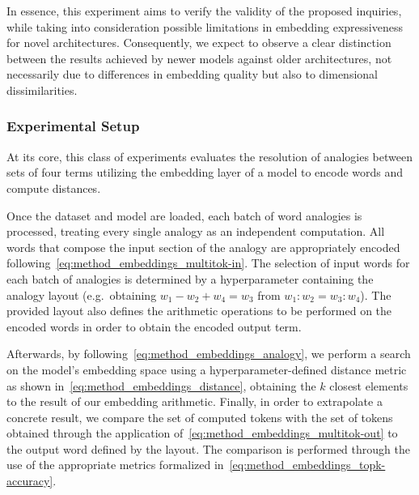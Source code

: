 In essence, this experiment aims to verify the validity of the proposed inquiries, while taking into consideration possible limitations in embedding expressiveness for novel architectures.
Consequently, we expect to observe a clear distinction between the results achieved by newer models against older architectures, not necessarily due to differences in embedding quality but also to dimensional dissimilarities.

\subsubsection{Experimental Setup}\label{sssec:exp_emb_exp1_expset}

At its core, this class of experiments evaluates the resolution of analogies between sets of four terms utilizing the embedding layer of a model to encode words and compute distances.

Once the dataset and model are loaded, each batch of word analogies is processed, treating every single analogy as an independent computation.
All words that compose the input section of the analogy are appropriately encoded following~\cref{eq:method_embeddings_multitok-in}.
The selection of input words for each batch of analogies is determined by a hyperparameter containing the analogy layout (e.g.\ obtaining $w_1 - w_2 + w_4 = w_3$ from $w_1 : w_2 = w_3 : w_4$).
The provided layout also defines the arithmetic operations to be performed on the encoded words in order to obtain the encoded output term.

Afterwards, by following~\cref{eq:method_embeddings_analogy}, we perform a search on the model's embedding space using a hyperparameter-defined distance metric as shown in~\cref{eq:method_embeddings_distance}, obtaining the $k$ closest elements to the result of our embedding arithmetic.
Finally, in order to extrapolate a concrete result, we compare the set of computed tokens with the set of tokens obtained through the application of~\cref{eq:method_embeddings_multitok-out} to the output word defined by the layout.
The comparison is performed through the use of the appropriate metrics formalized in~\cref{eq:method_embeddings_topk-accuracy}.


